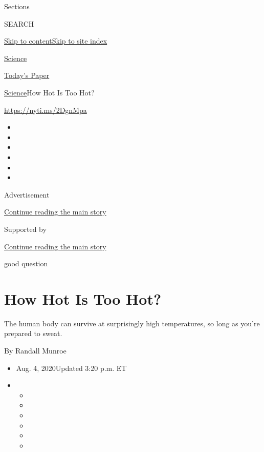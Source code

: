 Sections

SEARCH

\protect\hyperlink{site-content}{Skip to
content}\protect\hyperlink{site-index}{Skip to site index}

\href{https://www.nytimes3xbfgragh.onion/section/science}{Science}

\href{https://myaccount.nytimes3xbfgragh.onion/auth/login?response_type=cookie\&client_id=vi}{}

\href{https://www.nytimes3xbfgragh.onion/section/todayspaper}{Today's
Paper}

\href{/section/science}{Science}\textbar{}How Hot Is Too Hot?

\url{https://nyti.ms/2DgnMpa}

\begin{itemize}
\item
\item
\item
\item
\item
\item
\end{itemize}

Advertisement

\protect\hyperlink{after-top}{Continue reading the main story}

Supported by

\protect\hyperlink{after-sponsor}{Continue reading the main story}

good question

\hypertarget{how-hot-is-too-hot}{%
\section{How Hot Is Too Hot?}\label{how-hot-is-too-hot}}

The human body can survive at surprisingly high temperatures, so long as
you're prepared to sweat.

By Randall Munroe

\begin{itemize}
\item
  Aug. 4, 2020Updated 3:20 p.m. ET
\item
  \begin{itemize}
  \item
  \item
  \item
  \item
  \item
  \item
  \end{itemize}
\end{itemize}

